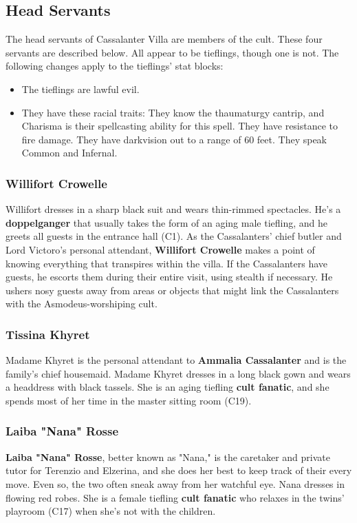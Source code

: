 \documentclass[10pt,a4paper,twoside,twocolumn,openany,nodeprecatedcode]{dndbook}
\begin{document}
\subsection{Head Servants}
The head servants of Cassalanter Villa are members of the cult. These four servants are described below. All appear to be tieflings, though one is not. The following changes apply to the tieflings' stat blocks:
\begin{itemize}

\item The tieflings are lawful evil.
\item They have these racial traits: They know the thaumaturgy cantrip, and Charisma is their spellcasting ability for this spell. They have resistance to fire damage. They have darkvision out to a range of 60 feet. They speak Common and Infernal.
\end{itemize}


\subsubsection{Willifort Crowelle}
Willifort dresses in a sharp black suit and wears thin-rimmed spectacles. He's a \textbf{doppelganger} that usually takes the form of an aging male tiefling, and he greets all guests in the entrance hall (C1).
As the Cassalanters' chief butler and Lord Victoro's personal attendant, \textbf{Willifort Crowelle} makes a point of knowing everything that transpires within the villa. If the Cassalanters have guests, he escorts them during their entire visit, using stealth if necessary. He ushers nosy guests away from areas or objects that might link the Cassalanters with the Asmodeus-worshiping cult.
\subsubsection{Tissina Khyret}
Madame Khyret is the personal attendant to \textbf{Ammalia Cassalanter} and is the family's chief housemaid.
Madame Khyret dresses in a long black gown and wears a headdress with black tassels. She is an aging tiefling \textbf{cult fanatic}, and she spends most of her time in the master sitting room (C19).
\subsubsection{Laiba "Nana" Rosse}
\textbf{Laiba "Nana" Rosse}, better known as "Nana," is the caretaker and private tutor for Terenzio and Elzerina, and she does her best to keep track of their every move. Even so, the two often sneak away from her watchful eye.
Nana dresses in flowing red robes. She is a female tiefling \textbf{cult fanatic} who relaxes in the twins' playroom (C17) when she's not with the children.
\end{document}
